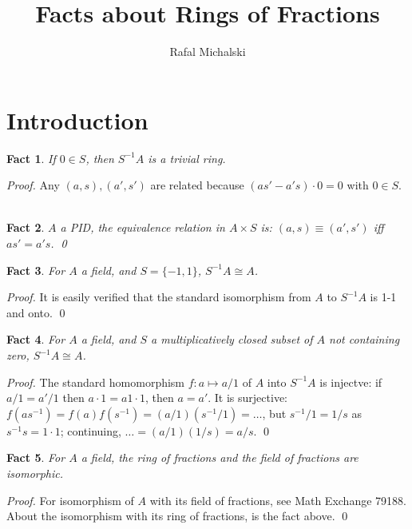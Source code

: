 \documentclass{article}
\title{Facts about Rings of Fractions}
\author{Rafal Michalski}
\date{}
\newtheorem{theorem}{Fact}[section]
\begin{document}
 

\maketitle

\section{Introduction}

\begin{theorem}
If $0 \in S$, then $S^{-1}A$ is a trivial ring.
\end{theorem}

\noindent
\textit{Proof.} Any $(a, s), (a', s')$ are related because $(as' - a's) \cdot 0 = 0$ with $0 \in S$. \

\bigskip

\begin{theorem}
$A$ a PID, the equivalence relation in $ A \times S $ is: $ (a, s) \equiv (a', s') $ iff $ as' = a's $. \qed
\end{theorem}

\bigskip
\begin{theorem}
For $A$ a field, and $S = \{-1, 1\}$, $S^{-1}A \cong A$.
\end{theorem}

\noindent
\textit{Proof.} It is easily verified that the standard isomorphism from $A$ to $S^{-1}A$ is 1-1 and onto. \qed

\bigskip
\begin{theorem}
For $A$ a field, and $S$ a multiplicatively closed subset of $A$ not containing zero, $S^{-1}A \cong A$.
\end{theorem}

\noindent
\textit{Proof.} The standard homomorphism $f:a \mapsto a/1$ of $A$ into $S^{-1}A$ is injectve: if $a/1 = a'/1$ then $a \cdot 1 = a1 \cdot 1$, then $a = a'$. It is surjective: $f(as^{-1}) = f(a)f(s^{-1}) = (a/1)(s^{-1}/1) = \ldots$, but $s^{-1}/1 = 1/s$ as $s^{-1}s = 1 \cdot 1$; continuing, $\ldots = (a/1)(1/s) = a/s$. \qed

\bigskip
\begin{theorem}
For $A$ a field, the ring of fractions and the field of fractions are isomorphic.
\end{theorem}

\noindent
\textit{Proof.} For isomorphism of $A$ with its field of fractions, see Math Exchange 79188. About the isomorphism with its ring of fractions, is the fact above. \qed
\end{document}
